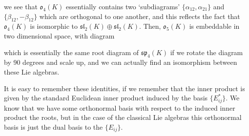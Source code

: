 \begin{example}
\begin{center}
    \end{center}
    we see that $\mathfrak{o}_4(K)$ essentially contains two `subdiagrams' $\{ \alpha_{12}, \alpha_{21} \}$ and $\{ \beta_{12}, -\beta_{12} \}$ which are orthogonal to one another, and this reflects the fact that $\mathfrak{o}_4(K)$ is isomorphic to $\mathfrak{sl}_2(K) \oplus \mathfrak{sl}_2(K)$. Then, $\mathfrak{o}_5(K)$ is embeddable in two dimensional space, with diagram
    \begin{center}
    \end{center}
    which is essentially the same root diagram of $\mathfrak{sp}_4(K)$ if we rotate the diagram by 90 degrees and scale up, and we can actually find an isomorphism between these Lie algebras.
\end{example}

It is easy to remember these identities, if we remember that the inner product is given by the standard Euclidean inner product induced by the basis $\{ E_{ij}^* \}$. We know that we have some orthonormal basis with respect to the induced inner product the roots, but in the case of the classical Lie algebras this orthonormal basis is just the dual basis to the $\{ E_{ij} \}$.

